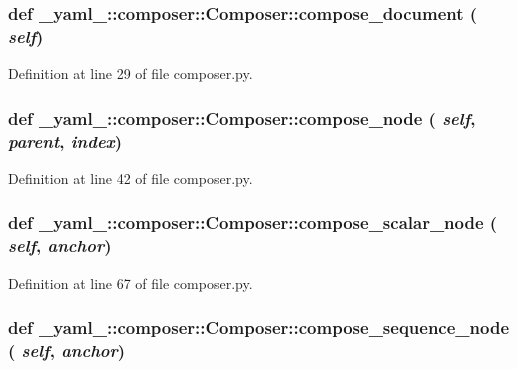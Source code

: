 \subsubsection{\setlength{\rightskip}{0pt plus 5cm}def \_\-yaml\_\-::composer::Composer::compose\_\-document ( {\em self})}\label{class__yaml___1_1composer_1_1Composer_31ca388e5ad71018a8b7f92ea7ebdeb8}




Definition at line 29 of file composer.py.
\subsubsection{\setlength{\rightskip}{0pt plus 5cm}def \_\-yaml\_\-::composer::Composer::compose\_\-node ( {\em self},  {\em parent},  {\em index})}\label{class__yaml___1_1composer_1_1Composer_bbbc9f39f4ebf2423a0406a7ef63fc17}




Definition at line 42 of file composer.py.
\subsubsection{\setlength{\rightskip}{0pt plus 5cm}def \_\-yaml\_\-::composer::Composer::compose\_\-scalar\_\-node ( {\em self},  {\em anchor})}\label{class__yaml___1_1composer_1_1Composer_4b8cd4b8cf75385ee9874fd1497350ec}




Definition at line 67 of file composer.py.
\subsubsection{\setlength{\rightskip}{0pt plus 5cm}def \_\-yaml\_\-::composer::Composer::compose\_\-sequence\_\-node ( {\em self},  {\em anchor})}\label{class__yaml___1_1composer_1_1Composer_5b66fa1c5ec52990e03fa3c36b8ae973}




